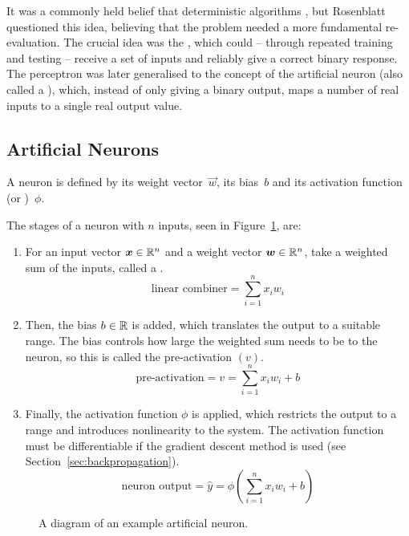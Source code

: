It was a commonly held belief that deterministic algorithms , but Rosenblatt questioned this idea, believing that the problem needed a more fundamental re-evaluation.
The crucial idea was the , which could -- through repeated training and testing -- receive a set of inputs and reliably give a correct binary response.
The perceptron was later generalised to the concept of the artificial neuron (also called a ), which, instead of only giving a binary output, maps a number of real inputs to a single real output value.

\subsection{Artificial Neurons}

A neuron is defined by its weight vector~\(\vec{w}\), its bias~\(b\) and its activation function (or )~\(\phi\).

The stages of a neuron with \(n\) inputs, seen in Figure~\ref{fig:neuron-example}, are:
\begin{enumerate}
	\item For an input vector \(\bm{x} \in \mathbb{R}^n\) and a weight vector \(\bm{w} \in \mathbb{R}^n\), take a weighted sum of the inputs, called a .
	      \[ \text{linear combiner} = \sum_{i=1}^{n}{x_i w_i} \]
	\item Then, the bias \(b \in \mathbb{R}{}\) is added, which translates the output to a suitable range.
	      The bias controls how large the weighted sum needs to be to  the neuron, so this is called the pre-activation \((v)\).
	      \[ \text{pre-activation} = v = \sum_{i=1}^{n}{x_i w_i} + b \]
	\item Finally, the activation function \(\phi\) is applied, which restricts the output to a range and introduces nonlinearity to the system.
	      The activation function must be differentiable if the gradient descent method is used (see Section~\ref{sec:backpropagation}).
	      \[ \text{neuron output} = \hat{y} = \phi\left(\sum_{i=1}^{n}{x_i w_i} + b \right) \]
\end{enumerate}

\begin{figure}[htbp]
	\centering
	
	\caption{A diagram of an example artificial neuron.}
	\label{fig:neuron-example}
\end{figure}

